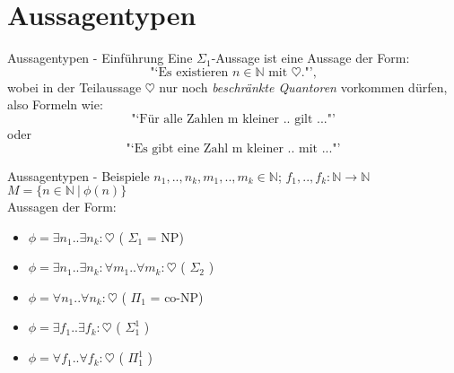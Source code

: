 \section{Aussagentypen}



\begin{frame}[c]{Aussagentypen - Einführung}
    \large
    Eine $\Sigma_1$-Aussage ist eine Aussage der Form: \\
    \[ \text{"`Es existieren $n \in \mathbb{N}$ mit $\heartsuit$."',}\]
        \pause
    wobei in der Teilaussage $\heartsuit$ nur noch {\em beschränkte Quantoren} vorkommen dürfen, also Formeln wie:
    \pause
    \[ \text{"`Für alle Zahlen m kleiner .. gilt ..."'} \]
    oder
    \[ \text{"`Es gibt eine Zahl m kleiner .. mit ..."'} \]

\end{frame}


\begin{frame}[c]{Aussagentypen - Beispiele}
    \Large
    $n_1, .., n_k, m_1, .., m_k \in \mathbb{N}$;
     {$f_1, .., f_k : \mathbb{N} \rightarrow \mathbb{N}$} \\
    $M = \{ n \in \mathbb{N}\ |\ \phi(n)\}$ \\

    Aussagen der Form:
    \begin{itemize}
            \pause
        \item $\phi = \exists n_1 .. \exists n_k: \heartsuit$ ( $\Sigma_1$  { = NP})
            \pause
        \item $\phi = \exists n_1 .. \exists n_k: \forall m_1 .. \forall m_k: \heartsuit$ ( $\Sigma_2$ )
            \pause
        \item $\phi = \forall n_1 .. \forall n_k: \heartsuit$ ( $\Pi_1$  { = co-NP})
            \pause
        \item $\phi = \exists f_1 .. \exists f_k: \heartsuit$ ( $\Sigma_1^1$ )
            \pause
        \item $\phi = \forall f_1 .. \forall f_k: \heartsuit$ ( $\Pi_1^1$ )
    \end{itemize}

\end{frame}


